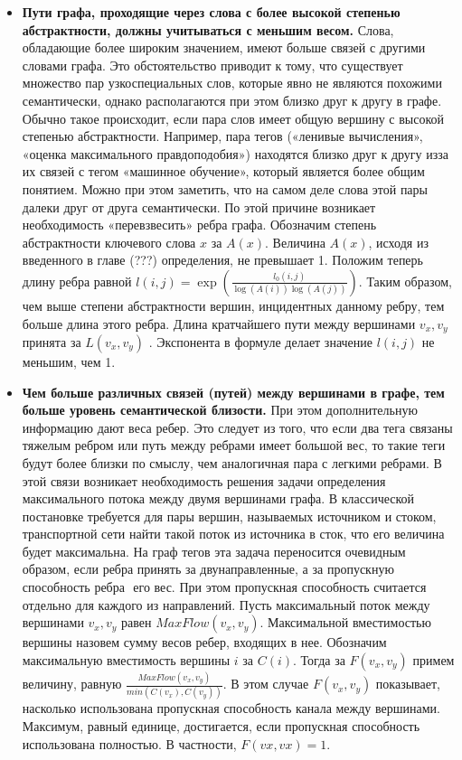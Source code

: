 \begin{itemize}
    \item \textbf{Пути графа, проходящие через слова с более высокой степенью абстрактности, должны учитываться с меньшим весом.} Слова, обладающие более широким значением, имеют больше связей с другими словами графа. Это обстоятельство приводит к тому, что существует множество пар узкоспециальных слов, которые явно не являются похожими семантически, однако располагаются при этом близко друг к другу в графе. Обычно такое происходит, если пара слов имеет общую вершину с высокой степенью абстрактности. Например, пара тегов («ленивые вычисления», «оценка максимального правдоподобия») находятся близко друг к другу из­за их связей с тегом «машинное обучение», который является более общим понятием. Можно при этом заметить, что на самом деле слова этой пары далеки друг от друга семантически. По этой причине возникает необходимость «перевзвесить» ребра графа. Обозначим степень абстрактности ключевого слова $x$ за $A(x)$. Величина $A(x)$, исходя из введенного в главе (???) определения, не превышает  1. Положим теперь длину ребра равной $l(i, j) = \exp(\frac{l_0(i, j)}{\log(A(i))\log(A(j))})$. Таким образом, чем выше степени абстрактности вершин, инцидентных данному ребру, тем больше длина этого ребра. Длина кратчайшего пути между вершинами $v_x, v_y$ принята за $L(v_x,v_y)$ . Экспонента в формуле делает значение $l(i, j)$ не меньшим, чем 1.
    \item \textbf{Чем больше различных связей (путей) между вершинами в графе, тем больше уровень семантической близости.} При этом дополнительную информацию дают веса ребер. Это следует из того, что если два тега связаны тяжелым ребром или путь между ребрами имеет большой вес, то такие теги будут более близки по смыслу, чем аналогичная пара с легкими ребрами. В этой связи возникает необходимость решения задачи определения максимального потока между двумя вершинами графа. В классической постановке требуется для пары вершин, называемых источником и стоком, транспортной сети найти такой поток из источника в сток, что его величина будет максимальна. На граф тегов эта задача переносится очевидным образом, если ребра принять за двунаправленные, а за пропускную способность ребра ­ его вес. При этом пропускная способность считается отдельно для каждого из направлений. Пусть максимальный поток между вершинами $v_x, v_y$ равен $MaxFlow(v_x, v_y)$. Максимальной вместимостью вершины назовем сумму весов ребер, входящих в нее. Обозначим максимальную вместимость вершины $i$ за $C(i)$. Тогда за $F(v_x,v_y)$ примем величину, равную $\frac{MaxFlow(v_x,v_y)}{min(C(v_x), C(v_y))}$. В этом случае $F(v_x,v_y)$ показывает, насколько использована пропускная способность канала между вершинами. Максимум, равный единице, достигается, если пропускная способность использована полностью. В частности, $F(vx,vx) = 1$.
\end{itemize}

